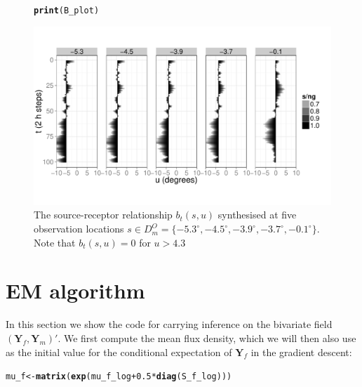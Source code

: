 \documentclass[a4paper,11pt]{article}\usepackage[]{graphicx}\usepackage[]{color}
\makeatletter
\def\maxwidth{ %
  \ifdim\Gin@nat@width>\linewidth
    \linewidth
  \else
    \Gin@nat@width
  \fi
}
\newcommand{\hlnum}[1]{\textcolor[rgb]{0.686,0.059,0.569}{#1}}%
\newcommand{\hlopt}[1]{\textcolor[rgb]{0,0,0}{#1}}%
\newcommand{\hlstd}[1]{\textcolor[rgb]{0.345,0.345,0.345}{#1}}%
\newcommand{\hlkwb}[1]{\textcolor[rgb]{0.69,0.353,0.396}{#1}}%
\newcommand{\hlkwd}[1]{\textcolor[rgb]{0.737,0.353,0.396}{\textbf{#1}}}%
\newenvironment{kframe}{%
 \def\at@end@of@kframe{}%
 \ifinner\ifhmode%
  \def\at@end@of@kframe{\end{minipage}}%
  \begin{minipage}{\columnwidth}%
 \fi\fi%
 \def\FrameCommand##1{\hskip\@totalleftmargin \hskip-\fboxsep
 \colorbox{shadecolor}{##1}\hskip-\fboxsep
     \hskip-\linewidth \hskip-\@totalleftmargin \hskip\columnwidth}%
 \MakeFramed {\advance\hsize-\width
   \@totalleftmargin\z@ \linewidth\hsize
   \@setminipage}}%
 {\par\unskip\endMakeFramed%
 \at@end@of@kframe}
\newenvironment{knitrout}{}{} %
\newcommand{\Yvec}{\mathbf{Y}}
\makeatother
\begin{document}
\begin{figure}
\begin{center}
\begin{knitrout}
\color{fgcolor}\begin{kframe}
\begin{alltt}
\hlkwd{print}\hlstd{(B_plot)}
\end{alltt}
\end{kframe}
\includegraphics[width=\maxwidth]{figure/B-plot-1} 

\end{knitrout}
\end{center}
\caption{ The source-receptor relationship $b_t(s,u)$ synthesised at five observation locations $s \in D^O_m = \{-5.3^\circ, -4.5^\circ,-3.9^\circ,-3.7^\circ,-0.1^\circ \}$. Note that $b_t(s,u) = 0$ for $u > 4.3$}
\label{fig:B}
\end{figure}






\section{EM algorithm}

In this section we show the code for carrying inference on the bivariate field $(\Yvec_f,\Yvec_m)'$. We first compute the mean flux density, which we will then also use as the initial value for the conditional expectation of $\Yvec_f$ in the gradient descent:


\begin{knitrout}
\color{fgcolor}\begin{kframe}
\begin{alltt}
\hlstd{mu_f} \hlkwb{<-} \hlkwd{matrix}\hlstd{(}\hlkwd{exp}\hlstd{(mu_f_log} \hlopt{+} \hlnum{0.5}\hlopt{*}\hlkwd{diag}\hlstd{(S_f_log)))}
\end{alltt}
\end{kframe}
\end{knitrout}
\end{document}
